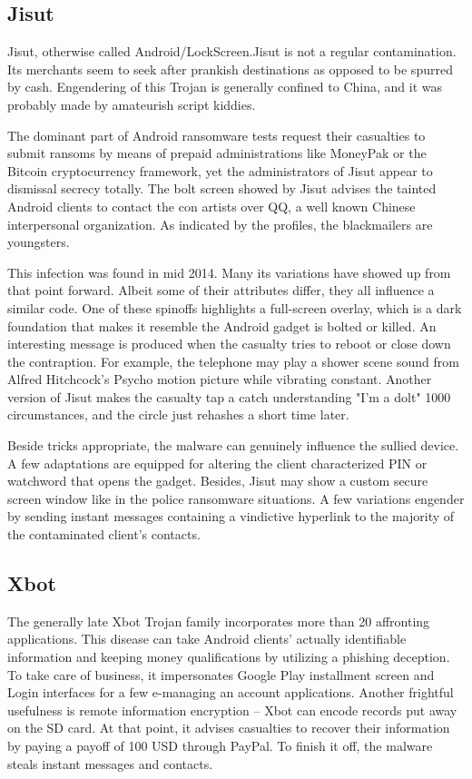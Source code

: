 \subsection{Jisut}
Jisut, otherwise called Android/LockScreen.Jisut is not a regular contamination. Its merchants seem to seek after prankish destinations as opposed to be spurred by cash. Engendering of this Trojan is generally confined to China, and it was probably made by amateurish script kiddies. 

The dominant part of Android ransomware tests request their casualties to submit ransoms by means of prepaid administrations like MoneyPak or the Bitcoin cryptocurrency framework, yet the administrators of Jisut appear to dismissal secrecy totally. The bolt screen showed by Jisut advises the tainted Android clients to contact the con artists over QQ, a well known Chinese interpersonal organization. As indicated by the profiles, the blackmailers are youngsters. 

This infection was found in mid 2014. Many its variations have showed up from that point forward. Albeit some of their attributes differ, they all influence a similar code. One of these spinoffs highlights a full-screen overlay, which is a dark foundation that makes it resemble the Android gadget is bolted or killed. An interesting message is produced when the casualty tries to reboot or close down the contraption. For example, the telephone may play a shower scene sound from Alfred Hitchcock's Psycho motion picture while vibrating constant. Another version of Jisut makes the casualty tap a catch understanding "I'm a dolt" 1000 circumstances, and the circle just rehashes a short time later. 

Beside tricks appropriate, the malware can genuinely influence the sullied device. A few adaptations are equipped for altering the client characterized PIN or watchword that opens the gadget. Besides, Jisut may show a custom secure screen window like in the police ransomware situations. A few variations engender by sending instant messages containing a vindictive hyperlink to the majority of the contaminated client's contacts.
\subsection{Xbot}

The generally late Xbot Trojan family incorporates more than 20 affronting applications. This disease can take Android clients' actually identifiable information and keeping money qualifications by utilizing a phishing deception. To take care of business, it impersonates Google Play installment screen and Login interfaces for a few e-managing an account applications. Another frightful usefulness is remote information encryption – Xbot can encode records put away on the SD card. At that point, it advises casualties to recover their information by paying a payoff of 100 USD through PayPal. To finish it off, the malware steals instant messages and contacts. 

